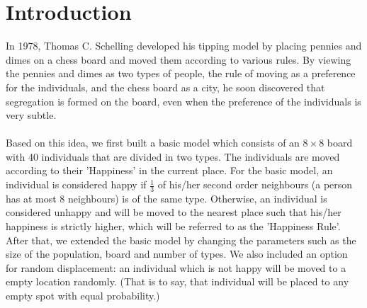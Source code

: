 \section{Introduction}
In 1978, Thomas C. Schelling developed his tipping model by placing pennies and dimes on a chess board and moved them according to various rules. 
By viewing the pennies and dimes as two types of people, the rule of moving as a preference for the individuals, and the chess board as a city, he soon discovered that segregation is formed on the board, even when the preference of the individuals is very subtle.\\
\\
Based on this idea, we first built a basic model which consists of an $8\times8$ board with 40 individuals that are divided in two types. 
The individuals are moved according to their 'Happiness' in the current place. 
For the basic model, an individual is considered happy if $\frac{1}{3}$ of his/her second order neighbours (a person has at most 8 neighbours) is of the same type. 
Otherwise, an individual is considered unhappy and will be moved to the nearest place such that his/her happiness is strictly higher, which will be referred to as the 'Happiness Rule'. 
After that, we extended the basic model by changing the parameters such as the size of the population, board and number of types. 
We also included an option for random displacement: an individual which is not happy will be moved to a empty location randomly. 
(That is to say, that individual will be placed to any empty spot with equal probability.)\\


